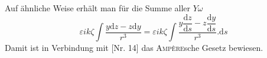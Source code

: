 Auf ähnliche Weise erhält man für die Summe aller $Y\omega$
\[
\varepsilon ik\zeta\int\frac{y\mathrm dz-z\mathrm dy}{r^3}=\varepsilon ik\zeta\int\frac{y\dfrac{\mathrm dz}{\mathrm ds}-z\dfrac{\mathrm dy}{\mathrm ds}}{r^3}.\mathrm ds
\]
Damit ist in Verbindung mit [Nr. 14] das \textsc{Ampère}sche Gesetz bewiesen.

